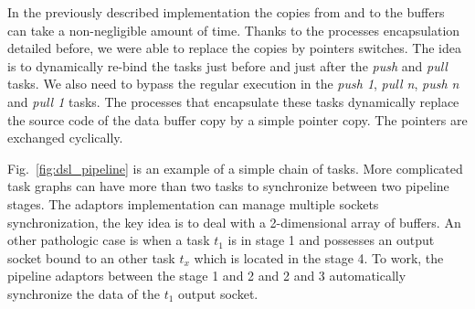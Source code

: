 
In the previously described implementation the copies from and to the buffers
can take a non-negligible amount of time. Thanks to the processes encapsulation
detailed before, we were able to replace the copies by pointers switches. The
idea is to dynamically re-bind the tasks just before and just after the
\emph{push} and \emph{pull} tasks. We also need to bypass the regular execution
in the \emph{push 1}, \emph{pull n}, \emph{push n} and \emph{pull 1} tasks. The
processes that encapsulate these tasks dynamically replace the source code of
the data buffer copy by a simple pointer copy. The pointers are exchanged
cyclically.


Fig.~\ref{fig:dsl_pipeline} is an example of a simple chain of tasks. More
complicated task graphs can have more than two tasks to synchronize between two
pipeline stages. The adaptors implementation can manage multiple sockets
synchronization, the key idea is to deal with a 2-dimensional array of buffers.
An other pathologic case is when a task $t_1$ is in stage 1 and possesses an
output socket bound to an other task $t_{x}$ which is located in the stage 4.
To work, the pipeline adaptors between the stage 1 and 2 and 2 and 3
automatically synchronize the data of the $t_1$ output socket.

